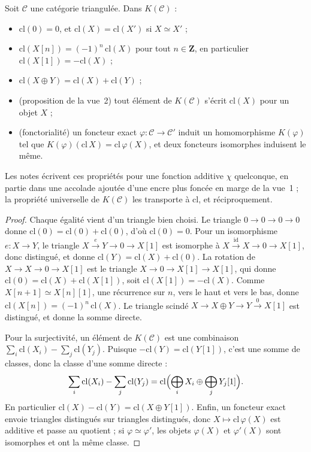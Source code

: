 \begin{encadre}
\begin{enonce}
Soit $\mathcal C$ une catégorie triangulée. Dans $K(\mathcal C)$ :
\begin{itemize}
\item $\mathrm{cl}(0) = 0$, et $\mathrm{cl}(X) = \mathrm{cl}(X')$ si $X \simeq X'$ ;
\item $\mathrm{cl}(X[n]) = (-1)^n\,\mathrm{cl}(X)$ pour tout $n \in \mathbf Z$, en particulier $\mathrm{cl}(X[1]) = -\mathrm{cl}(X)$ ;
\item $\mathrm{cl}(X \oplus Y) = \mathrm{cl}(X) + \mathrm{cl}(Y)$ ;
\item (proposition de la vue~2) tout élément de $K(\mathcal C)$ s'écrit $\mathrm{cl}(X)$ pour un objet $X$ ;
\item (fonctorialité) un foncteur exact $\varphi : \mathcal C \to \mathcal C'$ induit un homomorphisme $K(\varphi)$ tel que $K(\varphi)(\mathrm{cl}\,X) = \mathrm{cl}\,\varphi(X)$, et deux foncteurs isomorphes induisent le même.
\end{itemize}
\end{enonce}
\end{encadre}

\noindent Les notes écrivent ces propriétés pour une fonction additive $\chi$ quelconque, en partie dans une accolade ajoutée d'une encre plus foncée en marge de la vue~1 ; la propriété universelle de $K(\mathcal C)$ les transporte à $\mathrm{cl}$, et réciproquement.

\begin{proof}
Chaque égalité vient d'un triangle bien choisi. Le triangle $0 \to 0 \to 0 \to 0$ donne $\mathrm{cl}(0) = \mathrm{cl}(0) + \mathrm{cl}(0)$, d'où $\mathrm{cl}(0) = 0$. Pour un isomorphisme $e : X \to Y$, le triangle $X \xrightarrow{e} Y \to 0 \to X[1]$ est isomorphe à $X \xrightarrow{\mathrm{id}} X \to 0 \to X[1]$, donc distingué, et donne $\mathrm{cl}(Y) = \mathrm{cl}(X) + \mathrm{cl}(0)$. La rotation de $X \to X \to 0 \to X[1]$ est le triangle $X \to 0 \to X[1] \to X[1]$, qui donne $\mathrm{cl}(0) = \mathrm{cl}(X) + \mathrm{cl}(X[1])$, soit $\mathrm{cl}(X[1]) = -\mathrm{cl}(X)$. Comme $X[n+1] \simeq X[n][1]$, une récurrence sur $n$, vers le haut et vers le bas, donne $\mathrm{cl}(X[n]) = (-1)^n\,\mathrm{cl}(X)$. Le triangle scindé $X \to X \oplus Y \to Y \xrightarrow{0} X[1]$ est distingué, et donne la somme directe.

Pour la surjectivité, un élément de $K(\mathcal C)$ est une combinaison $\sum_i \mathrm{cl}(X_i) - \sum_j \mathrm{cl}(Y_j)$. Puisque $-\mathrm{cl}(Y) = \mathrm{cl}(Y[1])$, c'est une somme de classes, donc la classe d'une somme directe :
\[
  \sum_i \mathrm{cl}(X_i) - \sum_j \mathrm{cl}(Y_j) = \mathrm{cl}\Bigl(\bigoplus_i X_i \oplus \bigoplus_j Y_j[1]\Bigr).
\]
En particulier $\mathrm{cl}(X) - \mathrm{cl}(Y) = \mathrm{cl}(X \oplus Y[1])$. Enfin, un foncteur exact envoie triangles distingués sur triangles distingués, donc $X \mapsto \mathrm{cl}\,\varphi(X)$ est additive et passe au quotient ; si $\varphi \simeq \varphi'$, les objets $\varphi(X)$ et $\varphi'(X)$ sont isomorphes et ont la même classe.
\end{proof}

